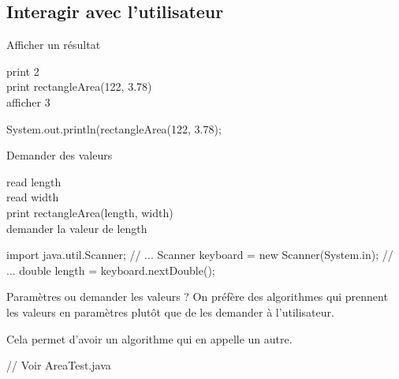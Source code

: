 \subsection{Interagir avec l'utilisateur}
\begin{frame}[fragile]{Afficher un résultat}
  \begin{langagenaturel}
print 2\\
print rectangleArea(122, 3.78)\\

afficher 3
  \end{langagenaturel}

  \pause
  \begin{center}
  \end{center}

  \pause
  \begin{java}
System.out.println(rectangleArea(122, 3.78);
  \end{java}
\end{frame}

\begin{frame}[fragile]{Demander des valeurs}
  \begin{langagenaturel}
    read length \\
    read width\\
    print rectangleArea(length, width)\\

    demander la valeur de length
  \end{langagenaturel}

  \pause
  \begin{java}
import java.util.Scanner;
// ...
Scanner keyboard = new Scanner(System.in);
// ...
double length = keyboard.nextDouble();
  \end{java}
\end{frame}

\begin{frame}[fragile]{Paramètres ou demander les valeurs ?}
  On préfère des algorithmes qui prennent les valeurs en paramètres plutôt que
  de les demander à l'utilisateur.

  Cela permet d'avoir un \alert{algorithme qui en appelle un autre}.

  \vfill

  \pause
  \begin{java}
    // Voir AreaTest.java
  \end{java}
\end{frame}

